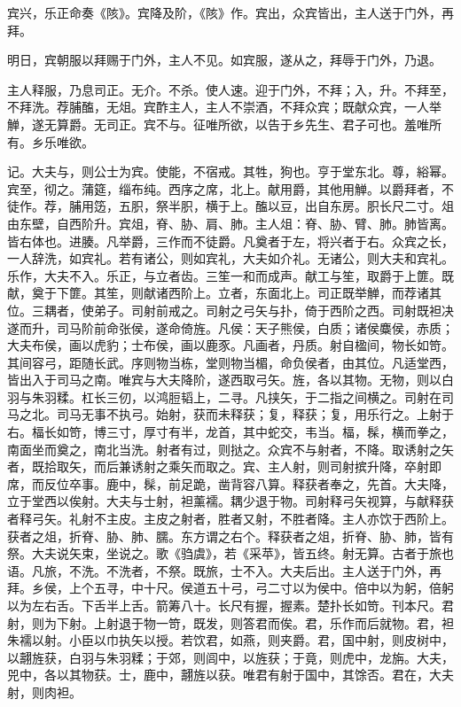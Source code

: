 \documentclass[]{article}
\begin{document}
宾兴，乐正命奏《陔》。宾降及阶，《陔》作。宾出，众宾皆出，主人送于门外，再拜。

明日，宾朝服以拜赐于门外，主人不见。如宾服，遂从之，拜辱于门外，乃退。

主人释服，乃息司正。无介。不杀。使人速。迎于门外，不拜；入，升。不拜至，不拜洗。荐脯醢，无俎。宾酢主人，主人不崇酒，不拜众宾；既献众宾，一人举觯，遂无算爵。无司正。宾不与。征唯所欲，以告于乡先生、君子可也。羞唯所有。乡乐唯欲。

记。大夫与，则公士为宾。使能，不宿戒。其牲，狗也。亨于堂东北。尊，綌幂。宾至，彻之。蒲筵，缁布纯。西序之席，北上。献用爵，其他用觯。以爵拜者，不徒作。荐，脯用笾，五胑，祭半胑，横于上。醢以豆，出自东房。胑长尺二寸。俎由东壁，自西阶升。宾俎，脊、胁、肩、肺。主人俎：脊、胁、臂、肺。肺皆离。皆右体也。进腠。凡举爵，三作而不徒爵。凡奠者于左，将兴者于右。众宾之长，一人辞洗，如宾礼。若有诸公，则如宾礼，大夫如介礼。无诸公，则大夫和宾礼。乐作，大夫不入。乐正，与立者齿。三笙一和而成声。献工与笙，取爵于上篚。既献，奠于下篚。其笙，则献诸西阶上。立者，东面北上。司正既举觯，而荐诸其位。三耦者，使弟子。司射前戒之。司射之弓矢与扑，倚于西阶之西。司射既袒决遂而升，司马阶前命张侯，遂命倚旌。凡侯：天子熊侯，白质；诸侯麋侯，赤质；大夫布侯，画以虎豹；士布侯，画以鹿豕。凡画者，丹质。射自楹间，物长如笴。其间容弓，距随长武。序则物当栋，堂则物当楣，命负侯者，由其位。凡适堂西，皆出入于司马之南。唯宾与大夫降阶，遂西取弓矢。旌，各以其物。无物，则以白羽与朱羽糅。杠长三仞，以鸿脰韬上，二寻。凡挟矢，于二指之间横之。司射在司马之北。司马无事不执弓。始射，获而未释获；复，释获；复，用乐行之。上射于右。楅长如笴，博三寸，厚寸有半，龙首，其中蛇交，韦当。楅，髹，横而拳之，南面坐而奠之，南北当洗。射者有过，则挞之。众宾不与射者，不降。取诱射之矢者，既拾取矢，而后兼诱射之乘矢而取之。宾、主人射，则司射摈升降，卒射即席，而反位卒事。鹿中，髹，前足跪，凿背容八算。释获者奉之，先首。大夫降，立于堂西以俟射。大夫与士射，袒薰襦。耦少退于物。司射释弓矢视算，与献释获者释弓矢。礼射不主皮。主皮之射者，胜者又射，不胜者降。主人亦饮于西阶上。获者之俎，折脊、胁、肺、臑。东方谓之右个。释获者之俎，折脊、胁、肺，皆有祭。大夫说矢束，坐说之。歌《驺虞》，若《采苹》，皆五终。射无算。古者于旅也语。凡旅，不洗。不洗者，不祭。既旅，士不入。大夫后出。主人送于门外，再拜。乡侯，上个五寻，中十尺。侯道五十弓，弓二寸以为侯中。倍中以为躬，倍躬以为左右舌。下舌半上舌。箭筹八十。长尺有握，握素。楚扑长如笴。刊本尺。君射，则为下射。上射退于物一笴，既发，则答君而俟。君，乐作而后就物。君，袒朱襦以射。小臣以巾执矢以授。若饮君，如燕，则夹爵。君，国中射，则皮树中，以翿旌获，白羽与朱羽糅；于郊，则闾中，以旌获；于竟，则虎中，龙旃。大夫，兕中，各以其物获。士，鹿中，翿旌以获。唯君有射于国中，其馀否。君在，大夫射，则肉袒。
\end{document}
